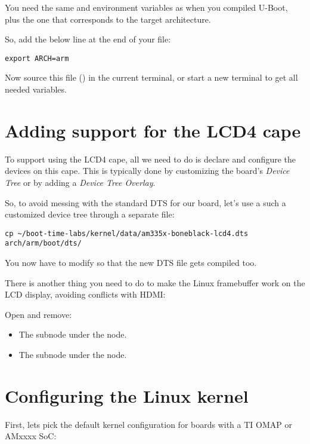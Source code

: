 You need the same  and  environment
variables as when you compiled U-Boot, plus the  one that
corresponds to the target architecture.

So, add the below line at the end of your  file:

\begin{verbatim}
export ARCH=arm
\end{verbatim}

Now source this file ()  in the current terminal,
or start a new terminal to get all needed variables.

\section{Adding support for the LCD4 cape}

To support using the LCD4 cape, all we need to do is declare and
configure the devices on this cape. This is typically done by
customizing the board's {\em Device Tree} or by adding a {\em Device
Tree Overlay}.

So, to avoid messing with the standard DTS for our board, let's use a
such a customized device tree through a separate file:

\begin{verbatim}
cp ~/boot-time-labs/kernel/data/am335x-boneblack-lcd4.dts arch/arm/boot/dts/
\end{verbatim}

You now have to modify  so that
the new DTS file gets compiled too.

There is another thing you need to do to make the Linux framebuffer work
on the LCD display, avoiding conflicts with HDMI:

Open  and remove:
\begin{itemize}
\item The  subnode under the  node.
\item The  subnode under the  node.
\end{itemize}

\section{Configuring the Linux kernel}

First, lets pick the default kernel configuration for boards with a TI
OMAP or AMxxxx SoC:

